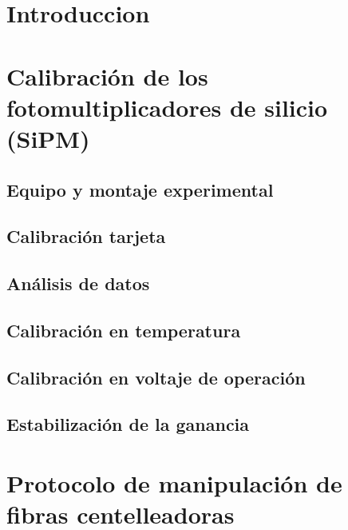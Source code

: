 \documentclass[11pt,a4paper]{article}
\begin{document}

%

\tableofcontents
\newpage


\section{Introduccion}  \label{sec:ch01}


\section{Calibración de los fotomultiplicadores de silicio (SiPM)} \label{sec:ch02}

	\subsection{Equipo y montaje experimental}
	
	
	\subsection{Calibración tarjeta}
	
	
	\subsection{Análisis de datos}
	
	
	\subsection{Calibración en temperatura}
	

	\subsection{Calibración en voltaje de operación}
	
	
	\subsection{Estabilización de la ganancia}
	


\section{Protocolo de manipulación de fibras centelleadoras} \label{sec:ch03}

\end{document}
